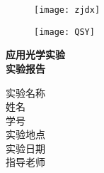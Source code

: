 \documentclass[a4paper]{article}
\begin{document}
\begin{titlepage}
	
	\begin{figure}[h]
		\centering
		\texttt{[image: zjdx]}
	\end{figure}

	\vspace*{0.5cm}
	\begin{figure}[h]
		\centering
		\texttt{[image: QSY]}
	\end{figure}
	\vspace{-0.5cm}
	\begin{center}
		\Huge{\textbf{应用光学实验}}\\
		
		\Huge{\textbf{实验报告}}
	\end{center}
	
	\vspace*{0.5cm}


	\vspace*{1cm}
    \begin{center}
            \Large 实验名称\ \ \underline{} \\ 
            \vspace{0.3cm}
            \quad \Large 姓名 \ \quad \underline{} \\ 
            \vspace{0.3cm}
            \quad \Large 学号\ \quad \underline{}\\
            \vspace{0.3cm}
            \Large 实验地点\ \ \underline{}\\
            \vspace{0.3cm}
            \Large 实验日期\ \ \underline{}\\
            \vspace{0.3cm}
            \Large 指导老师\ \ \underline{}\\
            

             
    \end{center}
        
    
\end{titlepage}

\newpage
\end{document}
